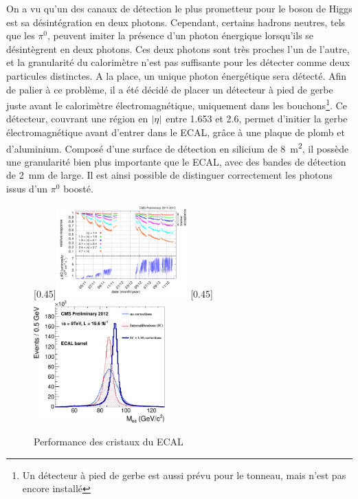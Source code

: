 On a vu qu'un des canaux de détection le plus prometteur pour le boson de Higgs est sa désintégration en deux photons. Cependant, certains hadrons neutres, tels que les $\pi^0$, peuvent imiter la présence d'un photon énergique lorsqu'ils se désintègrent en deux photons. Ces deux photons sont très proches l'un de l'autre, et la granularité du calorimètre n'est pas suffisante pour les détecter comme deux particules distinctes. A la place, un unique photon énergétique sera détecté. Afin de palier à ce problème, il a été décidé de placer un détecteur à pied de gerbe juste avant le calorimètre électromagnétique, uniquement dans les bouchons\footnote{Un détecteur à pied de gerbe est aussi prévu pour le tonneau, mais n'est pas encore installé}. Ce détecteur, couvrant une région en $\lvert \eta \rvert$ entre \num{1.653} et \num{2.6}, permet d'initier la gerbe électromagnétique avant d'entrer dans le ECAL, grâce à une plaque de plomb et d'aluminium. Composé d'une surface de détection en silicium de \SI{8}{\square\meter}, il possède une granularité bien plus importante que le ECAL, avec des bandes de détection de \SI{2}{\mm} de large. Il est ainsi possible de distinguer correctement les photons issus d'un $\pi^0$ boosté.

\begin{figure}[t] \centering
  [0.45\textwidth]{\includegraphics[width=0.45\textwidth]{chapitre2/figs/ecal_transparency.png}} \hfill
  [0.45\textwidth]{\includegraphics[width=0.45\textwidth]{chapitre2/figs/ecal_corrections_effect.pdf}}
  \caption{Performance des cristaux du ECAL}
  \label{fig:ecal_performance}
\end{figure}

